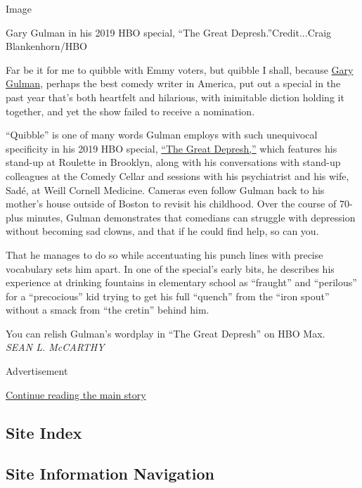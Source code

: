 Image

Gary Gulman in his 2019 HBO special, ``The Great
Depresh.''Credit...Craig Blankenhorn/HBO

Far be it for me to quibble with Emmy voters, but quibble I shall,
because \href{https://garygulman.com/}{Gary Gulman}, perhaps the best
comedy writer in America, put out a special in the past year that's both
heartfelt and hilarious, with inimitable diction holding it together,
and yet the show failed to receive a nomination.

``Quibble'' is one of many words Gulman employs with such unequivocal
specificity in his 2019 HBO special,
\href{https://www.hbo.com/specials/gary-gulman-the-great-depresh}{``The
Great Depresh,''} which features his stand-up at Roulette in Brooklyn,
along with his conversations with stand-up colleagues at the Comedy
Cellar and sessions with his psychiatrist and his wife, Sadé, at Weill
Cornell Medicine. Cameras even follow Gulman back to his mother's house
outside of Boston to revisit his childhood. Over the course of 70-plus
minutes, Gulman demonstrates that comedians can struggle with depression
without becoming sad clowns, and that if he could find help, so can you.

That he manages to do so while accentuating his punch lines with precise
vocabulary sets him apart. In one of the special's early bits, he
describes his experience at drinking fountains in elementary school as
``fraught'' and ``perilous'' for a ``precocious'' kid trying to get his
full ``quench'' from the ``iron spout'' without a smack from ``the
cretin'' behind him.

You can relish Gulman's wordplay in ``The Great Depresh'' on HBO Max.\\
\emph{SEAN L. McCARTHY}

Advertisement

\protect\hyperlink{after-bottom}{Continue reading the main story}

\hypertarget{site-index}{%
\subsection{Site Index}\label{site-index}}

\hypertarget{site-information-navigation}{%
\subsection{Site Information
Navigation}\label{site-information-navigation}}


